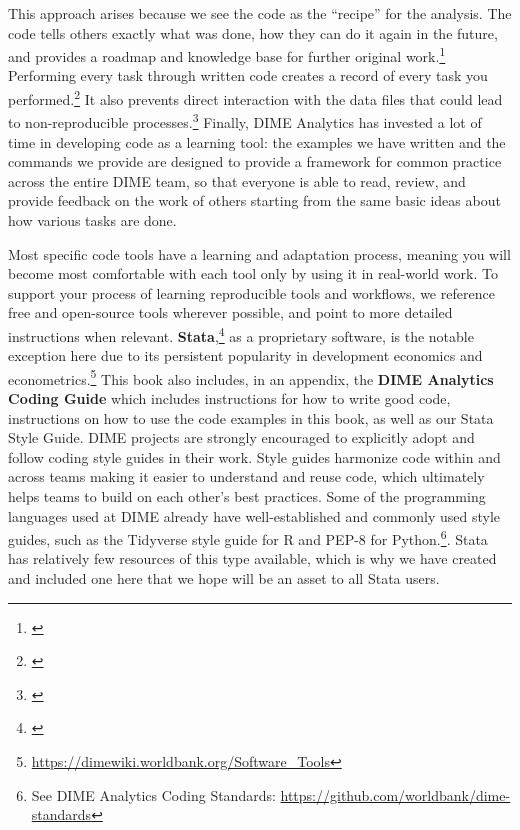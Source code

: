 This approach arises because we see the code as the ``recipe'' for the analysis.
The code tells others exactly what was done,
how they can do it again in the future,
and provides a roadmap and knowledge base for further original work.\footnote{\cite{hamermesh2007replication}}
Performing every task through written code
creates a record of every task you performed.\footnote{\cite{ozier2019replication}}
It also prevents direct interaction
with the data files that could lead to non-reproducible processes.\footnote{\cite{chang2015economics}}
Finally, DIME Analytics has invested a lot of time in developing code as a learning tool:
the examples we have written and the commands we provide
are designed to provide a framework for common practice
across the entire DIME team, so that everyone is able to
read, review, and provide feedback on the work of others
starting from the same basic ideas about how various tasks are done.

Most specific code tools have a learning and adaptation process,
meaning you will become most comfortable with each tool
only by using it in real-world work.
To support your process of learning reproducible tools and workflows,
we reference free and open-source tools wherever possible,
and point to more detailed instructions when relevant.
\textbf{Stata},\footnote{\cite{statacorp2019stata}}
as a proprietary software, is the notable exception here
due to its persistent popularity in development economics and econometrics.\footnote{
	\url{https://dimewiki.worldbank.org/Software_Tools}}
This book also includes, in an appendix,
the \textbf{DIME Analytics Coding Guide}
which includes instructions for how to write good code,
instructions on how to use the code examples in this book,
as well as our Stata Style Guide.
DIME projects are strongly encouraged to
explicitly adopt and follow coding style guides in their work.
Style guides harmonize code within and across teams
making it easier to understand and reuse code,
which ultimately helps teams to
build on each other's best practices.
Some of the programming languages used at DIME
already have well-established and commonly used style guides,
such as the Tidyverse style guide for R
and PEP-8 for Python.\footnote{See DIME Analytics Coding Standards:
	\url{https://github.com/worldbank/dime-standards}}.
Stata has relatively few resources of this type available,
which is why we have created and included one here that
we hope will be an asset to all Stata users.

